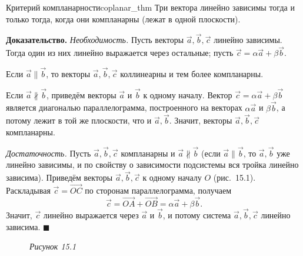 \documentclass[12pt,a4paper]{article}
\newenvironment{myproof}{\noindent\textbf{Доказательство.}}{\hfill$\blacksquare$}
\begin{document}
\begin{theorem}{Критерий компланарности}{coplanar_thm}
  Три вектора линейно зависимы тогда и только тогда, когда они
  компланарны (лежат в одной плоскости).
\end{theorem}

\begin{myproof}
  \textit{Необходимость.} Пусть векторы $\vec{a}, \vec{b}, \vec{c}$
  линейно зависимы. Тогда один из них линейно выражается через остальные;
  пусть $\vec{c} = \alpha\vec{a} + \beta\vec{b}$.

  Если $\vec{a} \parallel \vec{b}$, то векторы $\vec{a}, \vec{b}, \vec{c}$
  коллинеарны и тем более компланарны.

  Если $\vec{a} \nparallel \vec{b}$, приведём векторы $\vec{a}$ и
  $\vec{b}$ к одному началу. Вектор $\vec{c} = \alpha\vec{a} +
  \beta\vec{b}$ является диагональю параллелограмма, построенного на
  векторах $\alpha\vec{a}$ и $\beta\vec{b}$, а потому лежит в той же
  плоскости, что и $\vec{a}, \vec{b}$. Значит, векторы $\vec{a}, \vec{b},
  \vec{c}$ компланарны.

  \textit{Достаточность.} Пусть $\vec{a}, \vec{b}, \vec{c}$ компланарны и
  $\vec{a} \nparallel \vec{b}$ (если $\vec{a} \parallel \vec{b}$, то
    $\vec{a}, \vec{b}$ уже линейно зависимы, и по свойству о зависимости
  подсистемы вся тройка линейно зависима). Приведём векторы $\vec{a},
  \vec{b}, \vec{c}$ к одному началу $O$ (рис.~15.1).
  Раскладывая $\vec{c} = \overrightarrow{OC}$ по сторонам
  параллелограмма, получаем
  \[
    \vec{c} = \overrightarrow{OA} + \overrightarrow{OB} =
    \alpha\vec{a} + \beta\vec{b}.
  \]
  Значит, $\vec{c}$ линейно выражается через $\vec{a}$ и $\vec{b}$, и
  потому система $\vec{a}, \vec{b}, \vec{c}$ линейно зависима.
\end{myproof}

\begin{figure}[H]
  \centering

  \smallskip
  \textit{Рисунок 15.1}
\end{figure}
\end{document}
